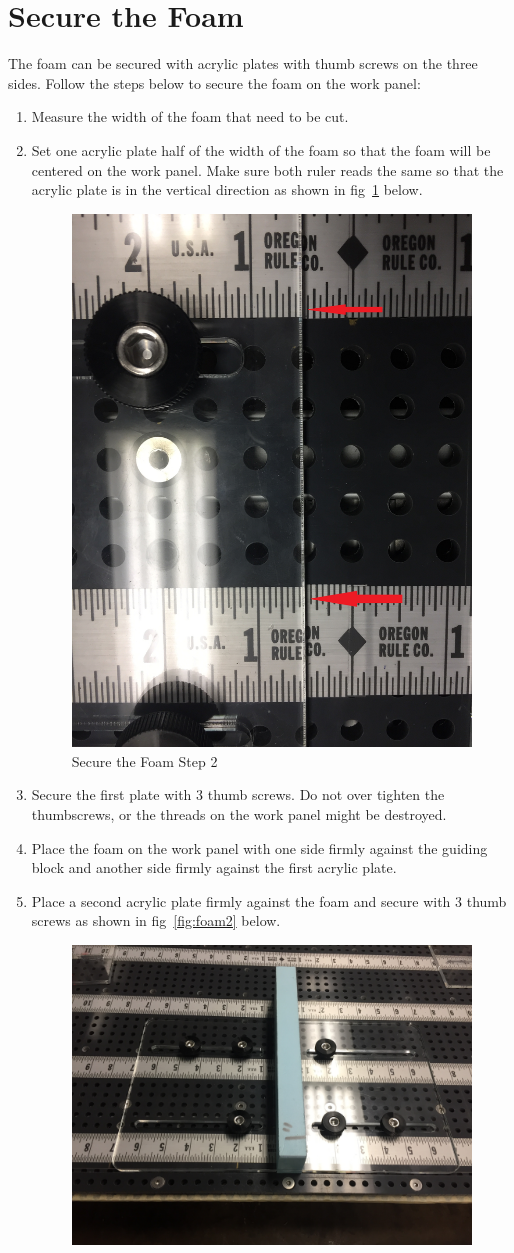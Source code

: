 \documentclass[titlepage,12pt,letter]{report}
\numberwithin{equation}{chapter}
\begin{document}
\section{Secure the Foam}
The foam can be secured with acrylic plates with thumb screws on the three sides. Follow the steps below to secure the foam on the work panel:
\begin{enumerate}[noitemsep,topsep=0pt]
	\item Measure the width of the foam that need to be cut.
	\item Set one acrylic plate half of the width of the foam so that the foam will be centered on the work panel. Make sure both ruler reads the same so that the acrylic plate is in the vertical direction as shown in fig~\ref{fig:foam1} below.
	\begin{figure} [H]
		\includegraphics[width = 0.45\linewidth]{./Figures/secure_foam/1.jpg}
		\caption{Secure the Foam Step 2}
		\label{fig:foam1}
	\end{figure}
	\item Secure the first plate with 3 thumb screws. Do not over tighten the thumbscrews, or the threads on the work panel might be destroyed.
	\item Place the foam on the work panel with one side firmly against the guiding block and another side firmly against the first acrylic plate.
	\item Place a second acrylic plate firmly against the foam and secure with 3 thumb screws as shown in fig~\ref{fig:foam2} below.
	\begin{figure} [H]
		\includegraphics[width = 0.6\linewidth]{./Figures/secure_foam/2.jpg}

\end{figure}
\end{enumerate}
\end{document}
